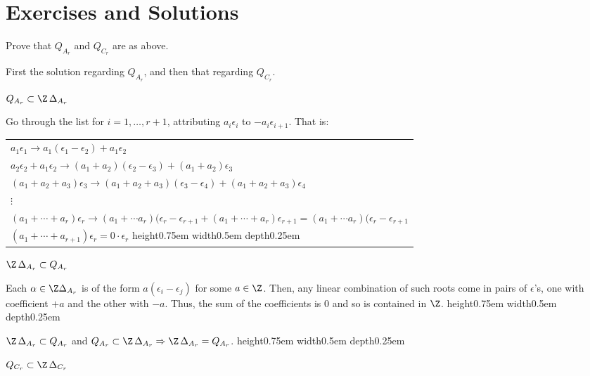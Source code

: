 \documentclass[11pt]{article}
\newenvironment{proof}[1][Proof]{\begin{trivlist}
\item[\hskip \labelsep {\bfseries #1}]}{\end{trivlist}}
\newenvironment{exercise}[1][Exercise]{\begin{trivlist}
\item[\hskip \labelsep {\bfseries #1}]}{\end{trivlist}}
\newenvironment{solution}[1][Solution]{\begin{trivlist}
\item[\hskip \labelsep {\bfseries #1}]}{\end{trivlist}}
\newenvironment{claim}[1][Claim]{\begin{trivlist}
\item[\hskip \labelsep {\bfseries #1}]}{\end{trivlist}}
\newcommand{\qed}{\nobreak \ifvmode \relax \else
      \ifdim\lastskip<1.5em \hskip-\lastskip
      \hskip1.5em plus0em minus0.5em \fi \nobreak
      \vrule height0.75em width0.5em depth0.25em\fi}
\begin{document}
\section{Exercises and Solutions}
%
\begin{exercise}
Prove that $Q_{A_r}$ and $Q_{C_r}$ are as above.
\end{exercise}
\begin{solution} First the solution regarding $Q_{A_r}$, and then that regarding $Q_{C_r}$.
\begin{claim} $Q_{A_r} \subset \Z \, \Delta_{A_r}$ \end{claim}
\begin{proof} Go through the list for $i=1,\ldots,r+1$,
attributing $a_i \epsilon_i$ to $-a_i \epsilon_{i+1}$.  That is:

\vspace{3mm}
\begin{tabular}{l}
$a_1 \epsilon_1 \rightarrow a_1 (\epsilon_1 - \epsilon_2) + a_1
\epsilon_2$ \\
$a_2 \epsilon_2 + a_1 \epsilon_2 \rightarrow (a_1 +
a_2)(\epsilon_2-\epsilon_3) + (a_1+a_2)\epsilon_3$ \\
$(a_1+a_2+a_3)\epsilon_3 \rightarrow
(a_1+a_2+a_3)(\epsilon_3-\epsilon_4)+(a_1+a_2+a_3)\epsilon_4$ \\
\hspace{10mm} $\vdots$ \\
$(a_1 + \cdots + a_r)\epsilon_r \rightarrow (a_1+\cdots
a_r)(\epsilon_r - \epsilon_{r+1} +
(a_1+\cdots+a_r)\epsilon_{r+1} = (a_1+\cdots a_r)(\epsilon_r - \epsilon_{r+1}$\\
$(a_1+\cdots+a_{r+1}) \epsilon_{r} = 0 \cdot \epsilon_r $ \qed
\end{tabular}
\end{proof}
\begin{claim} $\Z \, \Delta_{A_r} \subset Q_{A_r}$ \end{claim}
\begin{proof}
Each $\alpha \in \Z \Delta_{A_r}$ is of the form $a (\epsilon_i -
\epsilon_j)$ for some $a \in \Z$.  Then, any linear combination of
such roots come in pairs of $\epsilon$'s, one with coefficient
$+a$ and the other with $-a$.  Thus, the sum of the coefficients
is 0 and so is contained in $\Z$.\qed
\end{proof}
%
$\Z \, \Delta_{A_r} \subset Q_{A_r}$ and $Q_{A_r} \subset \Z \,
\Delta_{A_r} \Rightarrow \Z \, \Delta_{A_r} = Q_{A_r}$. \qed
%
\begin{claim}$Q_{C_r} \subset \Z \, \Delta_{C_r}$\end{claim}

\end{solution}
\end{document}
